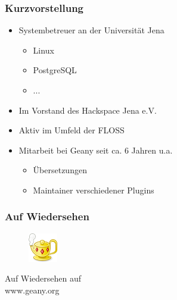 
%

\frame{\titlepage}
\frame{\tableofcontents}
\begin{frame}
	\frametitle{Kurzvorstellung}
	\begin{block}{}
		\begin{itemize}
			\item Systembetreuer an der Universität Jena 
				\begin{itemize}
					\item Linux
					\item PostgreSQL
					\item ...
				\end{itemize}
			\item Im Vorstand des Hackspace Jena e.V.
			\item Aktiv im Umfeld der FLOSS
			\item Mitarbeit bei Geany seit ca. 6 Jahren u.a. 
			\begin{itemize}
				\item Übersetzungen
				\item Maintainer verschiedener Plugins
			\end{itemize}
		\end{itemize}
	\end{block}
\end{frame}










\begin{frame}[plain]
	\frametitle{Auf Wiedersehen}
	\begin{figure}[ht]
		\includegraphics{../img/geany.png}
	\end{figure}

	\begin{center}
	\huge Auf Wiedersehen auf \\ www.geany.org
	\end{center}
\end{frame}


